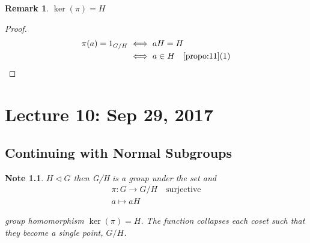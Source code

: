 \documentclass[11pt, oneside]{book}
\theoremstyle{break}
\newtheorem*{proof}{Proof}
\newtheorem*{remark}{Remark}
\newtheorem*{note}{Note}
\begin{document}
\begin{remark}
    $\ker(\pi) = H$
\end{remark}

\begin{proof}
    \begin{align*}
        \pi(a) = 1_{G/H} &\iff aH = H \\
            &\iff a \in H \quad \autoref{propo:11}\text{(1)}
    \end{align*}
\end{proof}

\chapter{Lecture 10: Sep 29, 2017}\label{chp:lec10}

\section{Continuing with Normal Subgroups}\label{sect:normal subgroups cont 2}

\begin{note}
    $H \triangleleft G$ then G/H is a group under the set %
    and 
    \begin{gather*}
        \pi : G \to G/H \quad \text{surjective} \\
        a \mapsto aH
    \end{gather*}

    group homomorphism $\ker(\pi) = H$. The function collapses each coset such that they become a single point, $G/H$.
\end{note}
\end{document}

